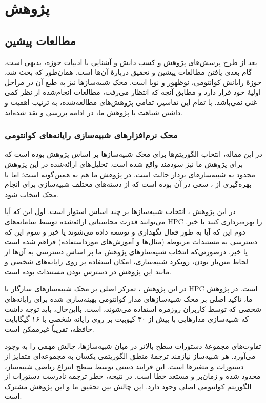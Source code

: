 \chapter{پژوهش‌}
\section{مطالعات پیشین}
بعد از طرح پرسش‌های پژوهش و کسب دانش و آشنایی با ادبیات حوزه، بدیهی است، گام بعدی یافتن مطالعات پیشین و تحقیق دربارهٔ آن‌ها است. همان‌طور که بحث شد، حوزهٔ رایانش کوانتومی، نوظهور و نوپا است. محک شبیه‌سازها نیز به طبع آن در مراحل اولیهٔ خود قرار دارد و مطابق آنچه که انتظار می‌رفت، مطالعات انجام‌شده از نظر کمی غنی نمی‌باشد. با تمام این تفاسیر، تمامی پژوهش‌های مطالعه‌شده، به ترتیب اهمیت و داشتن شباهت با پژوهش ما، در ادامه بررسی و نقد شده‌اند.

\subsection{محک نرم‌افزارهای شبیه‌سازی رایانه‌های کوانتومی\cite{jamadagni_benchmarking_2024}}
در این مقاله، انتخاب الگوریتم‌ها برای محک شبیه‌سازها بر اساس پژوهش \cite{dalzell_quantum_2023} بوده است که برای پژوهش ما نیز سودمند واقع شده است. تحلیل‌های ارائه‌شده در این پژوهش محدود به شبیه‌سازهای بردار حالت است. در پژوهش ما هم به همین‌گونه است؛ اما با بهره‌گیری از \cite{young_simulating_2023}، سعی در آن بوده است که از دسته‌های مختلف شبیه‌سازی برای انجام محک انتخاب شود.

در این پژوهش
\cite{jamadagni_benchmarking_2024}،
انتخاب شبیه‌سازها بر چند اساس استوار است. اول این که آیا می‌توانند قدرت محاسباتی ارائه‌شده توسط سامانه‌های HPC را بهره‌برداری ‌کنند یا خیر. دوم این که آیا به طور فعال نگهداری و توسعه داده می‌شوند یا خیر و سوم این که دسترسی به مستندات مربوطه (مثال‌ها و آموزش‌های مورداستفاده) فراهم شده است یا خیر. درصورتی‌که انتخاب شبیه‌سازهای پژوهش ما بر اساس دسترسی به آن‌ها از لحاظ متن‌باز بودن، رویکرد شبیه‌سازی، امکان استفاده بر روی رایانه‌های شخصی و مانند این پژوهش
\cite{jamadagni_benchmarking_2024}
در دسترس بودن مستندات بوده است.

در این پژوهش
\cite{jamadagni_benchmarking_2024}،
تمرکز اصلی بر محک شبیه‌سازهای سازگار با HPC است. در پژوهش ما، تأکید اصلی بر محک شبیه‌سازهای مدار کوانتومی بهینه‌سازی شده برای رایانه‌های شخصی که توسط کاربران روزمره استفاده می‌شوند، است. بااین‌حال، باید توجه داشت که شبیه‌سازی مدارهایی با بیش از ۳۰ کیوبیت بر روی رایانه شخصی با ۱۶ گیگابایت حافظه، تقریباً غیرممکن است.

تفاوت‌های مجموعهٔ دستورات سطح بالاتر در میان شبیه‌سازها، چالش مهمی را به وجود می‌آورد. هر شبیه‌ساز نیازمند ترجمهٔ منطق الگوریتمی یکسان به مجموعه‌ای متمایز از دستورات و متغیرها است. این فرایند دستی توسط سطح انتزاع ریاضی شبیه‌ساز، محدود شده و زمان‌بر و مستعد خطا است. در نتیجه، خطر ترجمه نادرست دستورات از الگوریتم کوانتومی اصلی وجود دارد. این چالش بین تحقیق ما و این پژوهش
\cite{jamadagni_benchmarking_2024}
مشترک است.

